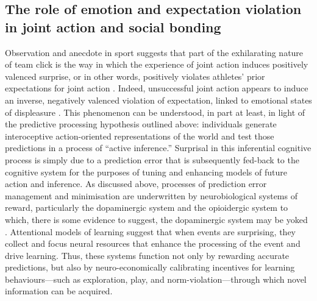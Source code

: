 \begin{CJK}{UTF8}{gbsn}
{%

\subsection{The role of emotion and expectation violation in joint action and social bonding}
Observation and anecdote in sport suggests that part of the exhilarating nature of team click is the way in which the experience of joint action induces positively valenced surprise, or in other words, positively violates athletes' prior expectations for joint action \citep{Jackson1999}.  Indeed, unsuccessful joint action appears to induce an inverse, negatively valenced violation of expectation, linked to emotional states of displeasure \citep{Ekkekakis2003}.  This phenomenon can be understood, in part at least, in light of the predictive processing hypothesis outlined above: individuals generate interoceptive action-oriented representations of the world and test those predictions in a process of ``active inference.'' Surprisal in this inferential cognitive process is simply due to a prediction error that is subsequently fed-back to the cognitive system for the purposes of tuning and enhancing models of future action and inference\citep{Clark2013}.
As discussed above, processes of prediction error management and minimisation are underwritten by neurobiological systems of reward, particularly the dopaminergic system \citep{Schultz2013} and the opioidergic system to which, there is some evidence to suggest, the dopaminergic system may be yoked \citep{Pecina2013,Laurent2014}. Attentional models of learning suggest that when events are surprising, they collect and focus neural resources that enhance the processing of the event and drive learning. Thus, these systems function not only by rewarding accurate predictions, but also by neuro-economically calibrating incentives for learning behaviours---such as exploration, play, and norm-violation---through which novel information can be acquired\citep{Little2013}.

}
\end{CJK}
